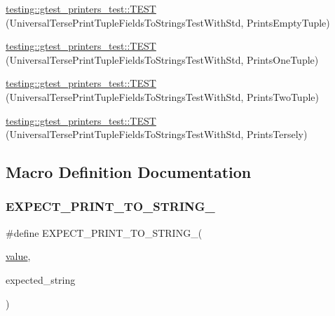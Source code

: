 \begin{DoxyCompactItemize}
\item 
\mbox{\hyperlink{namespacetesting_1_1gtest__printers__test_a4e30c6dbea7bf0ebcfa9b0e0d79e0283}{testing\+::gtest\+\_\+printers\+\_\+test\+::\+T\+E\+ST}} (Universal\+Terse\+Print\+Tuple\+Fields\+To\+Strings\+Test\+With\+Std, Prints\+Empty\+Tuple)
\item 
\mbox{\hyperlink{namespacetesting_1_1gtest__printers__test_a09537ac3801c572e0ce9bade09fd9d79}{testing\+::gtest\+\_\+printers\+\_\+test\+::\+T\+E\+ST}} (Universal\+Terse\+Print\+Tuple\+Fields\+To\+Strings\+Test\+With\+Std, Prints\+One\+Tuple)
\item 
\mbox{\hyperlink{namespacetesting_1_1gtest__printers__test_a2ad138c4bcc4afb2deae1466ad3351f1}{testing\+::gtest\+\_\+printers\+\_\+test\+::\+T\+E\+ST}} (Universal\+Terse\+Print\+Tuple\+Fields\+To\+Strings\+Test\+With\+Std, Prints\+Two\+Tuple)
\item 
\mbox{\hyperlink{namespacetesting_1_1gtest__printers__test_a2121c7c548cc174639947ff8f810759a}{testing\+::gtest\+\_\+printers\+\_\+test\+::\+T\+E\+ST}} (Universal\+Terse\+Print\+Tuple\+Fields\+To\+Strings\+Test\+With\+Std, Prints\+Tersely)
\end{DoxyCompactItemize}


\subsection{Macro Definition Documentation}
\mbox{\label{googletest-master_2googletest_2test_2googletest-printers-test_8cc_aa0ed482a6777cce04eecd24c530c78ec}} 
\subsubsection{\texorpdfstring{EXPECT\_PRINT\_TO\_STRING\_}{EXPECT\_PRINT\_TO\_STRING\_}}
{\footnotesize\ttfamily \#define E\+X\+P\+E\+C\+T\+\_\+\+P\+R\+I\+N\+T\+\_\+\+T\+O\+\_\+\+S\+T\+R\+I\+N\+G\+\_\+(\begin{DoxyParamCaption}\item[{}]{\mbox{\hyperlink{_obj__test_2lib_2googletest-master_2googlemock_2test_2gmock-matchers__test_8cc_a337b8a670efc0b086ad3af163f3121b6}{value}},  }\item[{}]{expected\+\_\+string }\end{DoxyParamCaption})}

